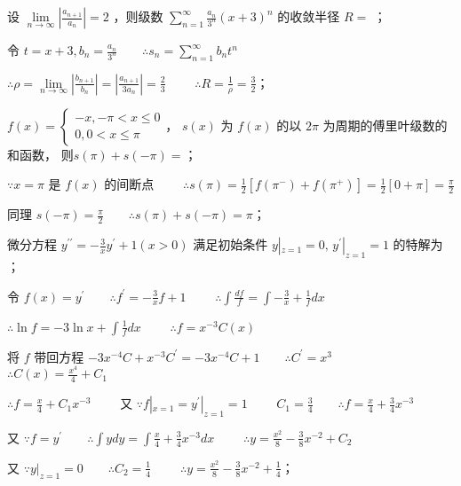 \begin{question}[points = 3]
    设 $\lim\limits_{n \to \infty} |\frac{a_{n + 1}}{a_n}| = 2$ ，则级数 $\sum\limits_{n = 1}^{\infty} \frac{a_n}{3^n}(x + 3)^n$
    的收敛半径 $R = $ \fillin[$\frac{3}{2}$]；
\end{question}
\begin{solution}
    令 $t = x + 3, b_n = \frac{a_n}{3^n} \qquad \therefore s_n = \sum\limits_{n = 1}^{\infty} b_n t^n$

    $\therefore \rho = \lim\limits_{n \to \infty} |\frac{b_{n + 1}}{b_n}| = |\frac{a_{n + 1}}{3 a_n}| = \frac{2}{3} \qquad$
    $\therefore R = \frac{1}{\rho} = \frac{3}{2}$；
\end{solution}

\begin{question}[points = 3]
    $f(x) =
        \begin{cases}
            -x, -\pi < x \leq 0 \\
            0, 0 < x \leq \pi
        \end{cases}$，
    $s(x)$ 为 $f(x)$ 的以 $2\pi$ 为周期的傅里叶级数的和函数，
    则$s(\pi) + s(-\pi) = $\fillin[$\pi$]；
\end{question}
\begin{solution}
    $\because x = \pi$ 是 $f(x)$ 的间断点 $\qquad \therefore s(\pi) = \frac{1}{2}[f(\pi^-) + f(\pi^+)] = \frac{1}{2}[0 + \pi] = \frac{\pi}{2}$

    同理 $s(-\pi) = \frac{\pi}{2} \qquad \therefore s(\pi) + s(-\pi) = \pi$；
\end{solution}

\begin{question}[points = 3]
    微分方程 $y^{\prime\prime} = -\frac{3}{x}y^{\prime} + 1 (x > 0)$ 满足初始条件 $y|_{z = 1} = 0, \, y^{\prime}|_{z = 1} = 1$
    的特解为 \fillin[$y = \frac{x^2}{8} - \frac{3}{8}x^{-2} + \frac{1}{4}$]；
\end{question}
\begin{solution}
    令 $f(x) = y^{\prime} \qquad \therefore f^{\prime} = -\frac{3}{x}f + 1 \qquad$
    $\therefore \int\frac{df}{f} = \int -\frac{3}{x} + \frac{1}{f} dx$

    $\therefore \ln f = -3\ln x + \int\frac{1}{f}dx \qquad$
    $\therefore f = x^{-3}C(x)$

    将 $f$ 带回方程 $-3x^{-4}C + x^{-3}C^{\prime} = -3x^{-4}C + 1 \qquad \therefore C^{\prime} = x^3 \qquad$
    $\therefore C(x) = \frac{x^4}{4} + C_1$

    $\therefore f = \frac{x}{4} + C_1x^{-3} \qquad$
    又 $\because f|_{x = 1} = y^{\prime}|_{z = 1} = 1 \qquad$
    $C_1 = \frac{3}{4} \qquad \therefore f = \frac{x}{4} + \frac{3}{4}x^{-3}$

    又 $\because f = y^{\prime} \qquad \therefore \int y dy = \int \frac{x}{4} + \frac{3}{4}x^{-3} dx \qquad$
    $\therefore y = \frac{x^2}{8} - \frac{3}{8}x^{-2} + C_2$

    又 $\because y|_{z = 1} = 0 \qquad \therefore C_2 = \frac{1}{4} \qquad$
    $\therefore y = \frac{x^2}{8} - \frac{3}{8}x^{-2} + \frac{1}{4}$；
\end{solution}

